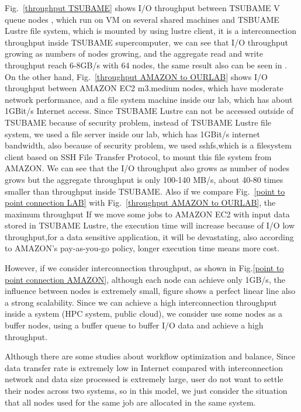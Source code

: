Fig.~\ref{throughput TSUBAME} shows I/O throughput between TSUBAME V queue nodes , which run on VM on several shared machines and TSBUAME Lustre file system, which is mounted by using lustre client, it is a interconnection throughput inside TSUBAME supercomputer, we can see that I/O throughput growing as numbers of nodes growing, and the aggregate read and write throughput reach 6-8GB/s with 64 nodes, the same result also can be seen in \cite{checkpointing}.
On the other hand, Fig.~\ref{throughput AMAZON to OURLAB} shows I/O throughput between AMAZON EC2 m3.medium nodes, which have moderate network performance, and a file system machine inside our lab, which has about 1GBit/s Internet access.
Since TSUBAME Lustre can not be accessed outside of TSUBAME because of security problem, instead of TSUBAME Lustre file system, we used a file server inside our lab, which has 1GBit/s internet bandwidth, also because of security problem, we used sshfs\cite{sshfs},which is a filesystem client based on SSH File Transfer Protocol, to mount this file system from AMAZON.
We can see that the I/O throughput also grows as number of nodes grows but the aggregate throughput is only 100-140 MB/s, about 40-80 times smaller than throughput inside TSUBAME.
Also if we compare Fig.~\ref{point to point connection LAB} with Fig.~\ref{throughput AMAZON to OURLAB}, the maximum throughput 
If we move some jobs to AMAZON EC2 with input data stored in TSUBAME Lustre, the execution time will increase because of I/O low throughput,for a data sensitive application, it will be devastating, also according to AMAZON's pay-as-you-go policy\cite{AMAZON_AWS}, longer execution time means more cost.

However, if we consider interconnection throughput, as shown in Fig.\ref{point to point connection AMAZON}, although each node can achieve only 1GB/s, the influence between nodes is extremely small, figure shows a perfect linear line also a strong scalability.
Since we can achieve a high interconnection throughput inside a system (HPC system, public cloud), we consider use some nodes as a buffer nodes, using a buffer queue to buffer I/O data and achieve a high throughput.

Although there are some studies about workflow optimization and  balance\cite{Workload}, Since data transfer rate is extremely low in Internet compared with interconnection network and data size processed is extremely large, user do not want to settle their nodes across two systems, so in this model, we just consider the situation that all nodes used for the same job are allocated in the same system.
